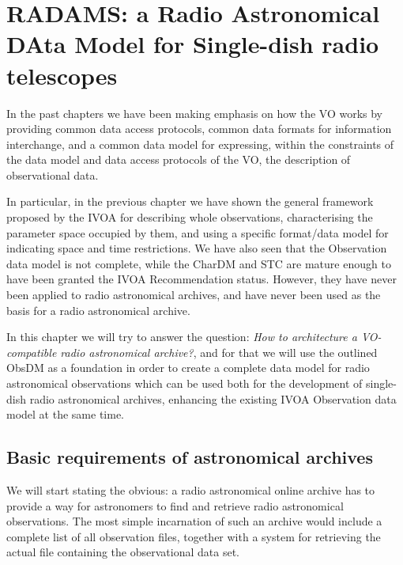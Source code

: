 
\chapter[Radio Astronomical DAta Model for Single-dish radio
telescopes]
{RADAMS: a Radio Astronomical DAta Model for Single-dish radio
telescopes}
\label{cha:radams}
	
	In the past chapters we have been making emphasis on how the VO
	works by providing common data access protocols, common data
	formats for information interchange, and a common data model
	for expressing, within the constraints of the data model and
	data access protocols of the VO, the description of
	observational data.
	
	In particular, in the previous chapter we have shown the
	general framework proposed by the IVOA for describing whole
	observations, characterising the parameter space occupied by
	them, and using a specific format/data model for indicating
	space and time restrictions. We have also seen that the
	Observation data model is not complete, while the CharDM and
	STC are mature enough to have been granted the IVOA
	Recommendation status. However, they have never been applied to
	radio astronomical archives, and have never been used as the
	basis for a radio astronomical archive.
	
	In this chapter we will try to answer the question: \emph{How
	to architecture a VO-compatible radio astronomical archive?},
	and for that we will use the outlined ObsDM as a foundation in
	order to create a complete data model for radio astronomical
	observations which can be used both for the development of
	single-dish radio astronomical archives, enhancing the existing
	IVOA Observation data model at the same time.
	
	\section{Basic requirements of astronomical archives} %
	\label{sec:radams_archive_basics}
		
		We will start stating the obvious: a radio astronomical
		online archive has to provide a way for astronomers to find
		and retrieve radio astronomical observations. The most
		simple incarnation of such an archive would include a
		complete list of all observation files, together with a
		system for retrieving the actual file containing the
		observational data set.
		
